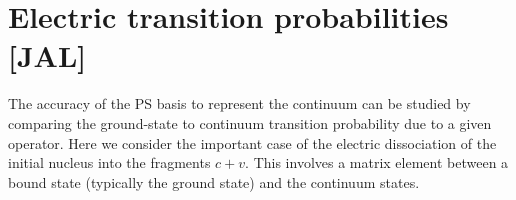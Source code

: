 \documentclass[preprint,12pt]{elsarticle}
\begin{document}
\begin{comment}
\begin{eqnarray}
& \langle (ls)j I J || V_{vc}(\vec{r},\vec{\xi}) || (l's')j' I' J' \rangle  =  \delta_{JJ'}(-1)^{(j'+I+J)} 
\left\lbrace \begin{array}{ccc} j & j' & \lambda \\ I'& I & J  \end{array} \right\rbrace 
\nonumber & \\
& \langle (ls)j || Y_{\lambda } || (l's')j' \rangle (2I+1)^{1/2}  \langle I || V_{\lambda}(r,\vec{\xi}) || I' \rangle . &
\label{redpot}
\end{eqnarray}

Ya sólo quedaría estudiar la naturaleza de la excitación del \textit{core} para dar forma a los distintos potenciales 
$\langle I || V_{\lambda}(r,\vec{\xi}) || I' \rangle$ como se muestra en las subsecciones siguientes.
 Nótese que en la prescripción de \cite{BS} estos elementos de matriz no son simétricos con respecto a $I$ e $I'$ como 
ocurre en otras definiciones para los elementos reducidos como la usada en \cite{BM}.
\end{comment}


\section{Electric transition probabilities \label{sec:bel} [JAL] } 
The accuracy of the PS basis to represent the continuum can be studied
by comparing the ground-state to continuum transition probability due
to a given operator. Here we consider the important case of the
electric dissociation of the initial nucleus into the fragments  
$c+v$.  This involves a matrix element between a bound state
(typically the ground state) and the continuum states.  
\end{document}
